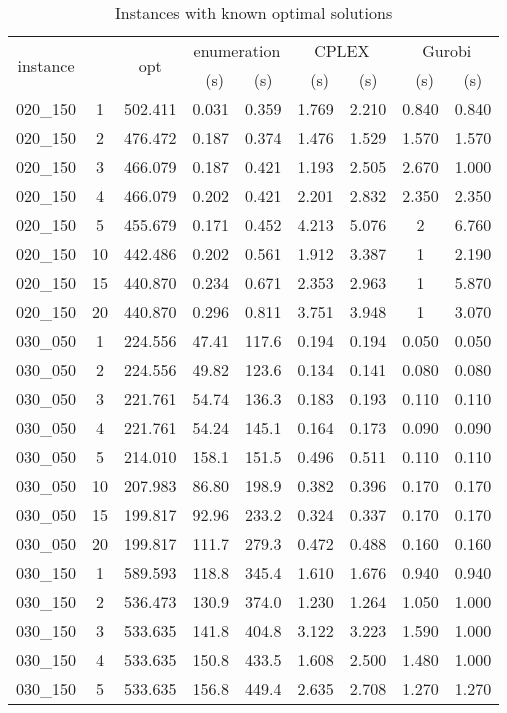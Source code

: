 \documentclass[10pt]{article}
\begin{document}
\begin{table}[h] \footnotesize
	\caption{Instances with known optimal solutions}
	\centering
\begin{tabular}{ccc|cc|cc|cc}
\hline 
\multirow{2}{*}{{instance}} & \multirow{2}{*}{{}} & \multirow{2}{*}{{opt}} & \multicolumn{2}{c|}{{enumeration}} & \multicolumn{2}{c|}{{CPLEX}} & \multicolumn{2}{c}{{Gurobi}}\tabularnewline
\cline{4-9} 
 &  &  & ~(s) &  (s) & ~(s) &  (s) & ~(s) &  (s)\tabularnewline
\hline 
{020\_150} & {1} & {502.411} & {0.031} & {0.359} & {1.769} & {2.210} & {0.840} & {0.840}\tabularnewline
{020\_150} & {2} & {476.472} & {0.187} & {0.374} & {1.476} & {1.529} & {1.570} & {1.570}\tabularnewline
{020\_150} & {3} & {466.079} & {0.187} & {0.421} & {1.193} & {2.505} & {2.670} & {1.000}\tabularnewline
{020\_150} & {4} & {466.079} & {0.202} & {0.421} & {2.201} & {2.832} & {2.350} & {2.350}\tabularnewline
{020\_150} & {5} & {455.679} & {0.171} & {0.452} & {4.213} & {5.076} & {2} & {6.760}\tabularnewline
{020\_150} & {10} & {442.486} & {0.202} & {0.561} & {1.912} & {3.387} & {1} & {2.190}\tabularnewline
{020\_150} & {15} & {440.870} & {0.234} & {0.671} & {2.353} & {2.963} & {1} & {5.870}\tabularnewline
{020\_150} & {20} & {440.870} & {0.296} & {0.811} & {3.751} & {3.948} & {1} & {3.070}\tabularnewline
\hline 
{030\_050} & {1} & {224.556} & {47.41} & {117.6} & {0.194} & {0.194} & {0.050} & {0.050}\tabularnewline
{030\_050} & {2} & {224.556} & {49.82} & {123.6} & {0.134} & {0.141} & {0.080} & {0.080}\tabularnewline
{030\_050} & {3} & {221.761} & {54.74} & {136.3} & {0.183} & {0.193} & {0.110} & {0.110}\tabularnewline
{030\_050} & {4} & {221.761} & {54.24} & {145.1} & {0.164} & {0.173} & {0.090} & {0.090}\tabularnewline
{030\_050} & {5} & {214.010} & {158.1} & {151.5} & {0.496} & {0.511} & {0.110} & {0.110}\tabularnewline
{030\_050} & {10} & {207.983} & {86.80} & {198.9} & {0.382} & {0.396} & {0.170} & {0.170}\tabularnewline
{030\_050} & {15} & {199.817} & {92.96} & {233.2} & {0.324} & {0.337} & {0.170} & {0.170}\tabularnewline
{030\_050} & {20} & {199.817} & {111.7} & {279.3} & {0.472} & {0.488} & {0.160} & {0.160}\tabularnewline
\hline 
{030\_150} & {1} & {589.593} & {118.8} & {345.4} & {1.610} & {1.676} & {0.940} & {0.940}\tabularnewline
{030\_150} & {2} & {536.473} & {130.9} & {374.0} & {1.230} & {1.264} & {1.050} & {1.000}\tabularnewline
{030\_150} & {3} & {533.635} & {141.8} & {404.8} & {3.122} & {3.223} & {1.590} & {1.000}\tabularnewline
{030\_150} & {4} & {533.635} & {150.8} & {433.5} & {1.608} & {2.500} & {1.480} & {1.000}\tabularnewline
{030\_150} & {5} & {533.635} & {156.8} & {449.4} & {2.635} & {2.708} & {1.270} & {1.270}\tabularnewline

\end{tabular}
\end{table}
\end{document}
